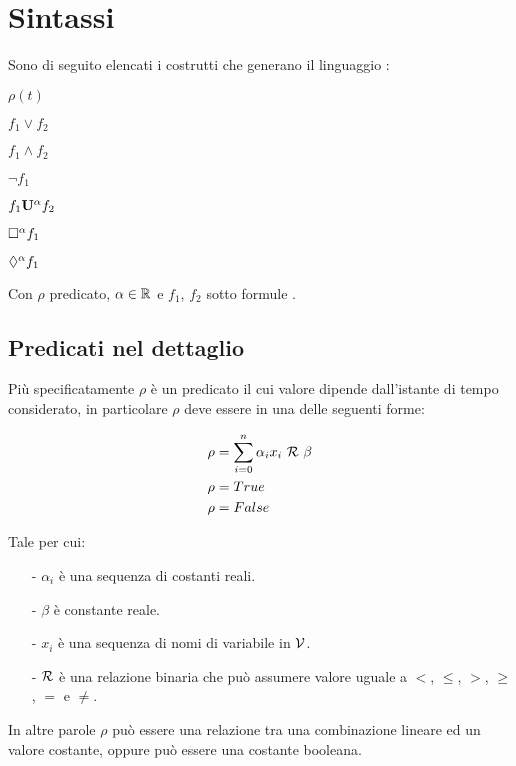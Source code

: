 \documentclass[10pt,a4paper]{article}
\begin{document}
	
	\section{Sintassi \BLTL}
	Sono di seguito elencati i costrutti che generano il linguaggio \BLTL{}:
	
	\begin{multicols}{2}	
	\begin{description}

		\item $\rho(t)$
		
		\item $f_1 \lor f_2$ 
		\item $f_1 \land f_2$ 
		
		
		\item $\lnot f_1$
	
	
		\item $f_1 \mathbf{U^{\alpha}} f_2$
		
		\item $\Box^{\alpha} f_1$
		
		\item $\Diamond^{\alpha} f_1 $
	\end{description}
	\end{multicols}
	Con $\rho$ predicato, $\alpha\in\mathbb{R}$ e $f_1$, $f_2$ sotto formule \BLTL{}.

	
	\newpage
	\subsection{Predicati nel dettaglio}
	Più specificatamente $\rho$ è un predicato il cui valore dipende dall'istante di tempo considerato, in particolare $\rho$ deve essere in una delle seguenti forme:
		
	\begin{align*}
			\rho &= \sum_{i=0}^{n}{\alpha{}_i x_i\ \MetaRel\ \beta{}}\\
			\rho &= True\\
			\rho &= False
	\end{align*}
	
	Tale per cui:
	\begin{itemize}
		\item  [-] $\alpha_i$ è una sequenza di costanti reali.
		\item  [-] $\beta$ è constante reale.
		\item  [-] $x_i$ è una sequenza di nomi di variabile in $\mathcal{V}$.
		\item [-] $\mathcal{R}$ è una relazione binaria che può assumere valore uguale a $<$, $\le$, $>$, $\ge$, $=$ e $\ne$.
	\end{itemize}
	In altre parole $\rho$ può essere una relazione tra una combinazione lineare ed un valore costante, oppure può essere una costante booleana.
	
\end{document}
